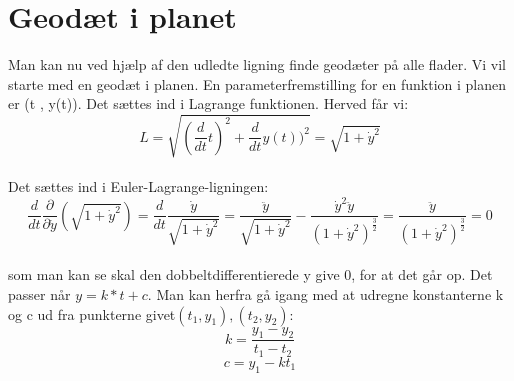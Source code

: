 \section{Geodæt i planet}
Man kan nu ved hjælp af den udledte ligning finde geodæter på alle flader. Vi vil starte med en geodæt i planen. En parameterfremstilling for en funktion i planen er (t , y(t)). Det sættes ind i Lagrange funktionen. Herved får vi: \\
$$L=\sqrt{(\frac{d}{dt}t)^2+\frac{d}{dt}y(t))^2}=\sqrt{1+\dot{y}^2}$$ \\
Det sættes ind i Euler-Lagrange-ligningen: \\
$$\frac{d}{dt} \frac{\partial}{\partial \dot{y}}(\sqrt{1+\dot{y}^2})=\frac{d}{dt} \frac{\dot{y}}{\sqrt{1+\dot{y}^2}} = \frac{\ddot{y}}{\sqrt{1+\dot{y}^2}}-\frac{\dot{y}^2\ddot{y}}{(1+\dot{y}^2)^\frac{3}{2}}=\frac{\ddot{y}}{(1+\dot{y}^2)^\frac{3}{2}}=0$$ \\
som man kan se skal den dobbeltdifferentierede y give 0, for at det går op. Det passer når $y=k*t+c$. Man kan herfra gå igang med at udregne konstanterne k og c ud fra punkterne givet$(t_{1},y_{1}),(t_{2},y_{2})$: \\
$$k=\frac{y_{1}-y_{2}}{t_{1}-t_{2}}$$
$$c=y_{1}-kt_{1}$$